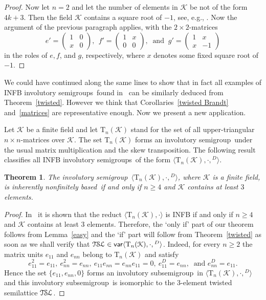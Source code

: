 \documentclass[11pt,reqno]{amsart}
\newcommand{\sgp}{semi\-group}
\newcommand{\is}{involutory semi\-group}
\newcommand{\iss}{involutory semi\-groups}
\newcommand{\infb}{inherently non\-finitely based}
\newcommand{\TSL}{\ensuremath{\mathcal{T\kern-.5pt S\kern-.5pt L}}}
\newtheorem{Thm}{Theorem}[section]
\DeclareMathOperator{\var}{\mathsf{var}}
\begin{document}
\begin{proof}
Now let $n=2$ and let the number of elements in $\mathcal{K}$ be not of the form $4k+3$. Then the field $\mathcal{K}$ contains a square
root of ${-1}$, see, e.g., \cite[Theorem~3.75]{LidlNiederreiter}. Now the argument of the previous paragraph applies, with the $2\times
2$-matrices
$$e'=\begin{pmatrix}
1 & 0 \\
x & 0
\end{pmatrix},\ \ f'=
\begin{pmatrix}
1 & x\\
0 & 0
\end{pmatrix},\ \text{ and }\
g'=
\begin{pmatrix}
1 & x \\
x & -1
\end{pmatrix}$$
in the roles of $e,f$, and $g$, respectively, where $x$ denotes some fixed square root of $-1$.
\end{proof}

We could have continued along the same lines to show that in fact all examples of INFB \iss\ found in~\cite{Dolinka:2010,ADV:2012} can be
similarly deduced from Theorem~\ref{twisted}. However we think that Corollaries~\ref{twisted Brandt} and~\ref{matrices} are representative
enough. Now we present a new application.

Let $\mathcal{K}$ be a finite field and let $\mathrm{T}_n(\mathcal{K})$ stand for the set of all upper-triangular $n\times n$-matrices over
$\mathcal{K}$. The set $\mathrm{T}_n(\mathcal{K})$ forms an \is\ under the usual matrix multiplication and the skew transposition. The
following result classifies all INFB \iss\ of the form $\langle\mathrm{T}_n(\mathcal{K}),\cdot,{}^D\rangle$.

\begin{Thm}
\label{triangular} The \is\ $\langle\mathrm{T}_n(\mathcal{K}),\cdot,{}^D\rangle$, where $\mathcal{K}$ is a finite field, is \infb\ if and
only if $n\ge 4$ and $\mathcal{K}$ contains at least $3$ elements.
\end{Thm}

\begin{proof}
In~\cite{Goldberg&Volkov:2003} it is shown that the reduct $\langle\mathrm{T}_n(\mathcal{K}),\cdot\rangle$ is INFB if and only if $n\ge 4$
and $\mathcal{K}$ contains at least $3$ elements. Therefore, the `only if' part of our theorem follows from Lemma~\ref{easy} and the `if'
part will follow from Theorem~\ref{twisted} as soon as we shall verify that
$\TSL\in\var\langle\mathrm{T}_n(\mathcal{K}),\cdot,{}^D\rangle$. Indeed, for every $n\ge2$ the matrix units $e_{11}$ and $e_{nn}$ belong to
$\mathrm{T}_n(\mathcal{K})$ and satisfy
$$e_{11}^2=e_{11},\ e_{nn}^2=e_{nn},\ e_{11}e_{nn}=e_{nn}e_{11}=0,\ e_{11}^D=e_{nn},\ \text{ and } e_{nn}^D=e_{11}.$$
Hence the set $\{e_{11},e_{nn},0\}$ forms an involutory sub\sgp\ in $\langle\mathrm{T}_n(\mathcal{K}),\cdot,{}^D\rangle$ and this
involutory sub\sgp\ is isomorphic to the 3-element twisted semilattice $\TSL$.
\end{proof}
\end{document}
